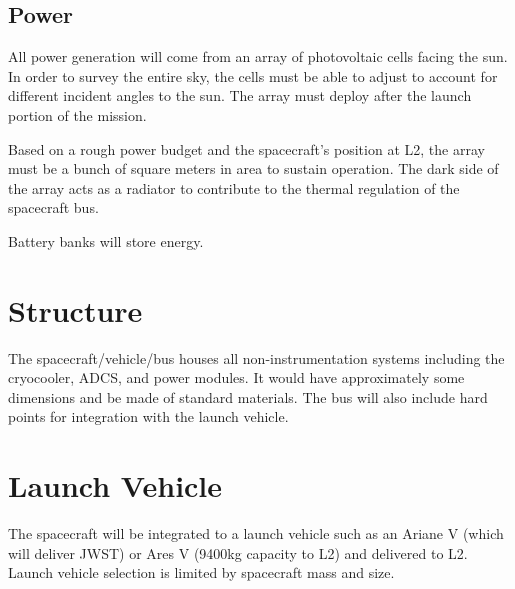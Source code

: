 \documentclass{ws-jai}
\begin{document}
\subsection{Power}
\label{subsec:power}
All power generation will come from an array of photovoltaic cells facing the sun.
In order to survey the entire sky, the cells must be able to adjust to account for different incident angles to the sun.
The array must deploy after the launch portion of the mission.

Based on a rough power budget and the spacecraft's position at L2, the array must be a bunch of square meters in area to sustain operation.
The dark side of the array acts as a radiator to contribute to the thermal regulation of the spacecraft bus.

Battery banks will store energy.

\section{Structure}
\label{sec:structure}
The spacecraft/vehicle/bus houses all non-instrumentation systems including the cryocooler, ADCS, and power modules.
It would have approximately some dimensions and be made of standard materials.
The bus will also include hard points for integration with the launch vehicle.

\section{Launch Vehicle}
\label{subsec:launch}
The spacecraft will be integrated to a launch vehicle such as an Ariane V (which will deliver JWST) or Ares V (9400kg capacity to L2) and delivered to L2.
Launch vehicle selection is limited by spacecraft mass and size.
\end{document}
